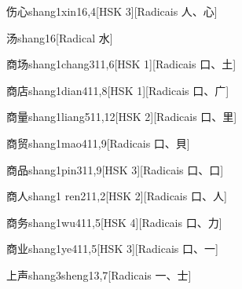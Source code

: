 \begin{entry}{伤心}{shang1xin1}{6,4}[HSK 3][Radicais ⼈、⼼]
\end{entry}

\begin{entry}{汤}{shang1}{6}[Radical ⽔]
\end{entry}

\begin{entry}{商场}{shang1chang3}{11,6}[HSK 1][Radicais ⼝、⼟]
\end{entry}

\begin{entry}{商店}{shang1dian4}{11,8}[HSK 1][Radicais ⼝、⼴]
\end{entry}

\begin{entry}{商量}{shang1liang5}{11,12}[HSK 2][Radicais ⼝、⾥]
\end{entry}

\begin{entry}{商贸}{shang1mao4}{11,9}[Radicais ⼝、⾙]
\end{entry}

\begin{entry}{商品}{shang1pin3}{11,9}[HSK 3][Radicais ⼝、⼝]
\end{entry}

\begin{entry}{商人}{shang1 ren2}{11,2}[HSK 2][Radicais ⼝、⼈]
\end{entry}

\begin{entry}{商务}{shang1wu4}{11,5}[HSK 4][Radicais ⼝、⼒]
\end{entry}

\begin{entry}{商业}{shang1ye4}{11,5}[HSK 3][Radicais ⼝、⼀]
\end{entry}

\begin{entry}{上声}{shang3sheng1}{3,7}[Radicais ⼀、⼠]
\end{entry}

